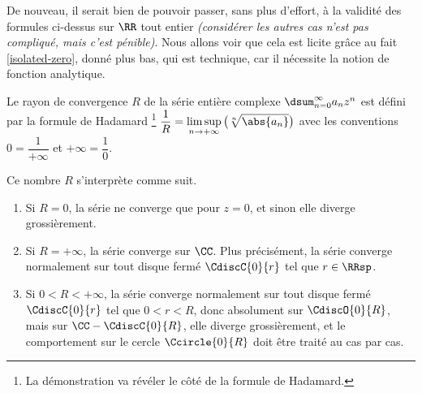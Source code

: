 De nouveau, il serait bien de pouvoir passer, sans plus d'effort, à la validité des formules ci-dessus sur $\RR$ tout entier \emph{(considérer les autres cas n'est pas compliqué, mais c'est pénible)}.
%
Nous allons voir que cela est licite grâce au fait \ref{isolated-zero}, donné plus bas, qui est technique, car il nécessite la notion de fonction analytique.




\begin{preli} \label{conv-ray}
    Le rayon de convergence $R$ de la série entière complexe $\dsum_{n=0}^{\infty} a_n z^n$ est défini par la formule de Hadamard%
    \footnote{
    	La démonstration va révéler le côté  de la formule de Hadamard.
    }
    $\displaystyle \frac{1}{R} = \limsup_{n \to +\infty} \big( \sqrt[n]{\abs{a_n}} \big)$
    avec les conventions
    $0 = \dfrac{1}{+\infty}$
    et
    $+\infty = \dfrac{1}{0}$.

    \smallskip
    
    Ce nombre $R$ s'interprète comme suit.
    \begin{enumerate}
        \item Si $R = 0$, la série ne converge que pour $z = 0$, et sinon elle diverge grossièrement.

        \item Si $R = +\infty$, la série converge sur $\CC$.
        Plus précisément, la série converge normalement sur tout disque fermé $\CdiscC{0}{r}$ tel que $r \in \RRsp$. 

        \item Si $0 < R < +\infty$, la série converge normalement sur tout disque fermé $\CdiscC{0}{r}$ tel que $0 < r < R$,
        donc absolument sur $\CdiscO{0}{R}$,
        mais sur $\CC - \CdiscC{0}{R}$, elle diverge grossièrement,
        et
        le comportement sur le cercle $\Ccircle{0}{R}$ doit être traité au cas par cas.
    \end{enumerate}
\end{preli}



